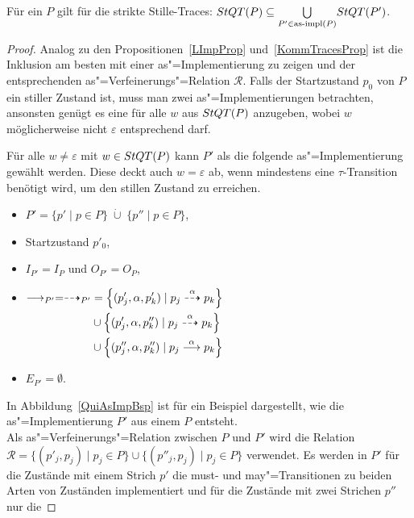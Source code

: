 \begin{Prop}
  \label{StilleTraceProp}
  Für ein \MEIO{} $P$ gilt für die strikte Stille-Traces: $StQT (P) \subseteq
  \underset{P'\in\mathrm{as}\text{-}\mathrm{impl} (P)}{\bigcup} StQT (P')$.
\end{Prop}
\begin{proof}
  Analog zu den Propositionen~\ref{LImpProp} und~\ref{KommTracesProp} ist die
  Inklusion am besten mit einer as"=Implementierung zu zeigen und der
  entsprechenden as"=Verfeinerungs"=Relation $\mathcal{R}$. Falls der
  Startzustand $p_0$ von $P$ ein stiller Zustand ist, muss man zwei
  as"=Implementierungen betrachten, ansonsten genügt es eine für alle $w$ aus
  $StQT (P)$ anzugeben, wobei $w$ möglicherweise nicht $\varepsilon$
  entsprechend darf.

  Für alle $w\neq \varepsilon$ mit $w\in StQT (P)$ kann $P'$ als die
  folgende as"=Implementierung gewählt werden. Diese deckt auch $w =
  \varepsilon$ ab, wenn mindestens eine $\tau$-Transition benötigt wird, um den
  stillen Zustand zu erreichen.
  \begin{itemize}
    \item $P'= \{p'\mid p\in P\}\; \dot{\cup}\; \{p''\mid p\in P\}$,
    \item Startzustand $p'_0$,
    \item $I_{P'}=I_P$ und $O_{P'}=O_P$,
    \item $\begin{aligned}[t] \must _{P'}=\may _{P'} &=
        \left\{(p'_j,\alpha ,p'_k)\mid p_j\may[\alpha] p_k\right\}\\
        &\cup \left\{(p'_j,\alpha ,p''_k)\mid p_j\may[\alpha] p_k\right\}\\
        &\cup \left\{(p''_j,\alpha ,p''_k)\mid p_j\must[\alpha] p_k\right\}
    \end{aligned}$
    \item $E_{P'}=\emptyset$.
  \end{itemize}
  In Abbildung~\ref{QuiAsImpBsp} ist für ein Beispiel dargestellt, wie die
  as"=Implementierung $P'$ aus einem \MEIO{} $P$ entsteht.\\
  Als as"=Verfeinerungs"=Relation zwischen $P$ und $P'$ wird die Relation
  $\mathcal{R}=\big\{(p'_j,p_j)\mid p_j\in P\big\} \cup \big\{(p''_j,p_j)\mid
  p_j\in P\big\}$ verwendet. Es werden in $P'$ für die Zustände mit einem
  Strich $p'$ die must- und may"=Transitionen zu beiden \glqq Arten\grqq{} von
  Zuständen implementiert und für die Zustände mit zwei Strichen $p''$ nur die

\end{proof}
